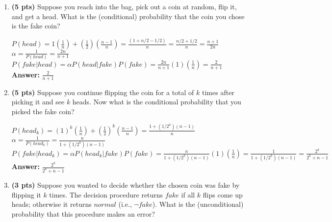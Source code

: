 \documentclass{article}
\begin{document}
\begin{enumerate}
    \begin{enumerate}[label=($\alph*$)]


    \item \textbf{(5 pts)} Suppose you reach into the bag, pick out a coin at random, flip it, and get a head. What is the (conditional) probability that the coin you chose is the fake coin?

    \color{blue}
        $P(head)=1(\frac{1}{n})+(\frac{1}{2})(\frac{n-1}{n})=\frac{(1+n/2-1/2)}{n}=\frac{n/2+1/2}{n}=\frac{n+1}{2n}$\\
        $\alpha=\frac{1}{P(head)}=\frac{2n}{n+1}$\\
        $P(fake|head)=\alpha P(head|fake)P(fake)=\frac{2n}{n+1}(1)(\frac{1}{n})=\frac{2}{n+1}$\\
        \textbf{Answer:} $\frac{2}{n+1}$
    \color{black}



    \item \textbf{(5 pts)} Suppose you continue flipping the coin for a total of $k$ times after picking it and see $k$ heads. Now what is the conditional probability that you picked the fake coin?

    \color{blue}
        $P(head_k)=(1)^k(\frac{1}{n})+(\frac{1}{2})^k(\frac{n-1}{n})=\frac{1+(1/2^k)(n-1)}{n}$\\
        $\alpha=\frac{1}{P(head_k)}=\frac{n}{1+(1/2^k)(n-1)}$\\
        $P(fake|head_k)=\alpha P(head_k|fake)P(fake)=\frac{n}{1+(1/2^k)(n-1)}(1)(\frac{1}{n})=\frac{1}{1+(1/2^k)(n-1)}=\frac{2^k}{2^k+n-1}$\\
        \textbf{Answer:} $\frac{2^k}{2^k+n-1}$
    \color{black}



    \item \textbf{(3 pts)} Suppose you wanted to decide whether the chosen coin was fake by flipping it $k$ times. The decision procedure returns $fake$ if all $k$ flips come up heads; otherwise it returns $normal$ (i.e., $\neg fake$). What is the (unconditional) probability that this procedure makes an error?


\end{enumerate}
\end{enumerate}
\end{document}
